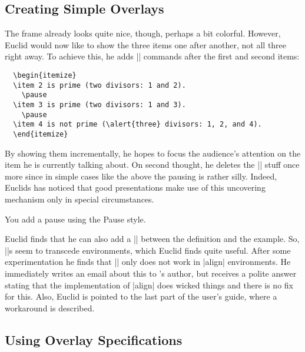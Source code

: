 \subsection{Creating Simple Overlays}

The frame already looks quite nice, though, perhaps a bit colorful. However, Euclid would now like to show the three items one after another, not all three right away. To achieve this, he adds |\pause| commands after the first and second items:
\begin{verbatim}
  \begin{itemize}
  \item 2 is prime (two divisors: 1 and 2).
    \pause
  \item 3 is prime (two divisors: 1 and 3).
    \pause
  \item 4 is not prime (\alert{three} divisors: 1, 2, and 4).
  \end{itemize}
\end{verbatim}

By showing them incrementally, he hopes to focus the audience's attention on the item he is currently talking about. On second thought, he deletes the |\pause| stuff once more since in simple cases like the above the pausing is rather silly. Indeed, Euclids has noticed that good presentations make use of this uncovering mechanism only in special circumstances.

\lyxnote
You add a pause using the Pause style.

Euclid finds that he can also add a |\pause| between the definition and the example. So, |\pause|s seem to transcede environments, which Euclid finds quite useful. After some experimentation he finds that |\pause| only does not work in |align| environments. He immediately writes an email about this to \beamer's author, but receives a polite answer stating that the implementation of |align| does wicked things and there is no fix for this. Also, Euclid is pointed to the last part of the user's guide, where a workaround is described.


\subsection{Using Overlay Specifications}

